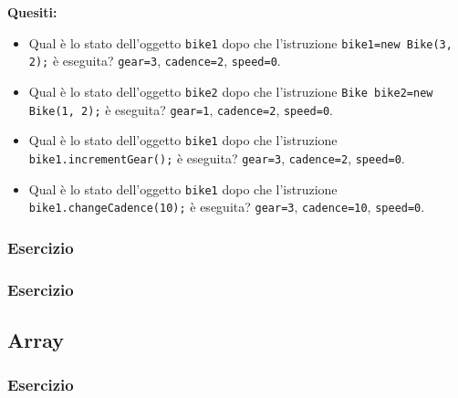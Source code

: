 \documentclass{article}
\theoremstyle{definition}
\begin{document}





\textbf{Quesiti:}\\
\begin{itemize}
\item Qual \`e lo stato dell'oggetto \texttt{bike1} dopo che l'istruzione   \texttt{bike1=new Bike(3, 2);} \`e eseguita? 
\texttt{gear=3}, \texttt{cadence=2}, \texttt{speed=0}.
\item Qual \`e lo stato dell'oggetto  \texttt{bike2} dopo che l'istruzione  \texttt{Bike bike2=new Bike(1, 2);} \`e eseguita? 
\texttt{gear=1}, \texttt{cadence=2}, \texttt{speed=0}.
\item Qual \`e lo stato dell'oggetto \texttt{bike1} dopo che l'istruzione \texttt{bike1.incrementGear();} \`e eseguita? 
\texttt{gear=3}, \texttt{cadence=2}, \texttt{speed=0}.
\item Qual \`e lo stato dell'oggetto \texttt{bike1} dopo che l'istruzione   \texttt{bike1.changeCadence(10);} \`e eseguita? 
\texttt{gear=3}, \texttt{cadence=10}, \texttt{speed=0}.
\end{itemize}

\subsubsection{Esercizio}




\subsubsection{Esercizio}





\subsection{Array}
\subsubsection{Esercizio}
\end{document}
